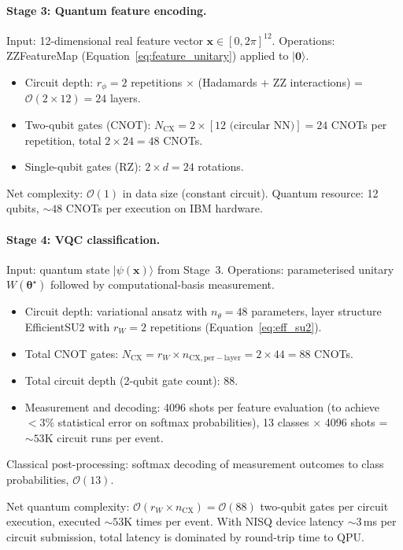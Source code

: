 \documentclass[11pt,a4paper, english]{book}
\theoremstyle{plain}
\theoremstyle{definition}
\numberwithin{equation}{chapter}
\numberwithin{figure}{chapter}
\numberwithin{table}{chapter}
\begin{document}
\paragraph{Stage 3: Quantum feature encoding.}
Input: 12-dimensional real feature vector $\mathbf{x} \in [0,2\pi]^{12}$. 
Operations: ZZFeatureMap (Equation~\ref{eq:feature_unitary}) applied to $|\mathbf{0}\rangle$.
\begin{itemize}
  \item Circuit depth: $r_\phi = 2$ repetitions $\times$ (Hadamards + ZZ interactions) 
        = $\mathcal{O}(2 \times 12) = 24$ layers.
  \item Two-qubit gates (CNOT): $N_{\mathrm{CX}} = 2 \times [12 \text{ (circular NN)}] 
        = 24$ CNOTs per repetition, total $2 \times 24 = 48$ CNOTs.
  \item Single-qubit gates (RZ): $2 \times d = 24$ rotations.
\end{itemize}
Net complexity: $\mathcal{O}(1)$ in data size (constant circuit). Quantum resource: 
12 qubits, $\sim 48$ CNOTs per execution on IBM hardware.

\paragraph{Stage 4: VQC classification.}
Input: quantum state $|\psi(\mathbf{x})\rangle$ from Stage~3. Operations: 
parameterised unitary $W(\boldsymbol{\theta}^\star)$ followed by computational-basis 
measurement.
\begin{itemize}
  \item Circuit depth: variational ansatz with $n_\theta = 48$ parameters, 
        layer structure EfficientSU2 with $r_W = 2$ repetitions (Equation~\ref{eq:eff_su2}).
  \item Total CNOT gates: $N_{\mathrm{CX}} = r_W \times n_{\mathrm{CX,per-layer}} 
        = 2 \times 44 = 88$ CNOTs.
  \item Total circuit depth (2-qubit gate count): 88.
  \item Measurement and decoding: 4096 shots per feature evaluation (to achieve 
        $< 3\%$ statistical error on softmax probabilities), 13 classes $\times$ 
        4096 shots = $\sim 53$K circuit runs per event.
\end{itemize}
Classical post-processing: softmax decoding of measurement outcomes to class 
probabilities, $\mathcal{O}(13)$.

Net quantum complexity: $\mathcal{O}(r_W \times n_{\mathrm{CX}}) = \mathcal{O}(88)$ 
two-qubit gates per circuit execution, executed $\sim 53$K times per event. With 
NISQ device latency $\sim 3$\,ms per circuit submission, total latency is 
dominated by round-trip time to QPU.
\end{document}
